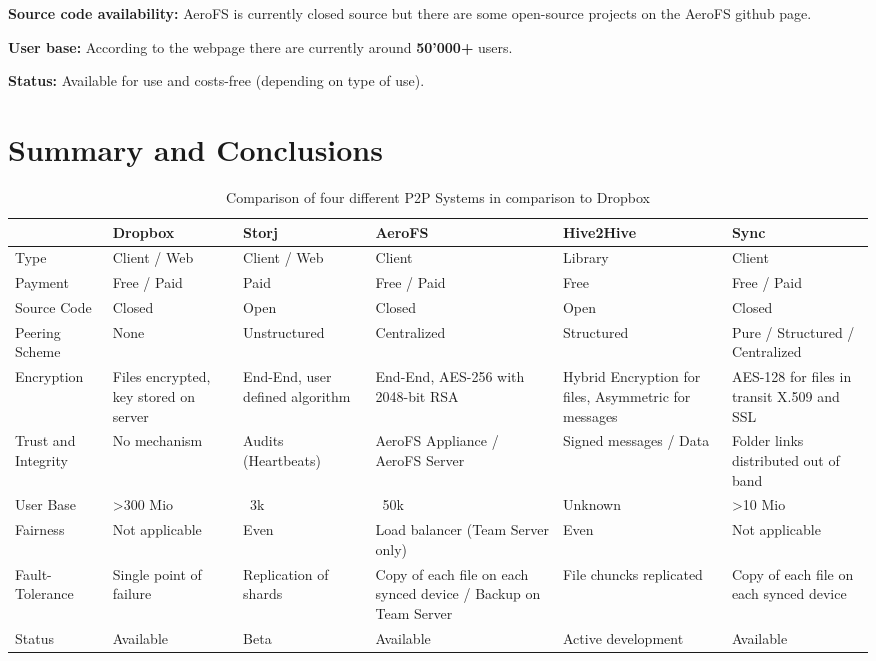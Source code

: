 \textbf{Source code availability:} AeroFS is currently closed source but there are some open-source projects on the AeroFS github page.

\textbf{User base:} According to the webpage \cite{aerofs} there are currently around \textbf{50'000\textsc{+}} users.

\textbf{Status:} Available for use and costs-free (depending on type of use).


\section{Summary and Conclusions}
\begin{table}
	\centering
	\caption{Comparison of four different P2P Systems in comparison to Dropbox}
		\begin{tabular}{ | *{6}{ p{2.5cm} |} }
			\hline
			& Dropbox & Storj & AeroFS & Hive2Hive & Sync \\ \hline
			Type & Client / Web & Client / Web & Client & Library & Client \\ \hline
			Payment & Free / Paid & Paid & Free / Paid & Free & Free / Paid \\ \hline
			Source Code & Closed & Open & Closed & Open & Closed \\ \hline
			Peering Scheme & None & Unstructured & Centralized & Structured & Pure / Structured / Centralized \\ \hline
			Encryption & Files encrypted, key stored on server & End-End, user defined algorithm & End-End, AES-256 with 2048-bit RSA & Hybrid Encryption for files, Asymmetric for messages & AES-128 for files in transit X.509 and SSL \\ \hline
			Trust and Integrity & No mechanism & Audits (Heartbeats) & AeroFS Appliance / AeroFS Server & Signed messages / Data & Folder links distributed out of band \\ \hline
			User Base & >300 Mio & ~3k & ~50k & Unknown & >10 Mio \\ \hline
			Fairness & Not applicable & Even & Load balancer (Team Server only) & Even & Not applicable \\ \hline
			Fault-Tolerance & Single point of failure & Replication of shards & Copy of each file on each synced device / Backup on Team Server & File chuncks replicated & Copy of each file on each synced device \\ \hline
			Status & Available & Beta & Available & Active development & Available \\ \hline
		\end{tabular}
\end{table}

